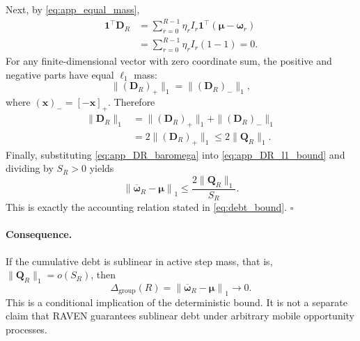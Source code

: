 Next, by \eqref{eq:app_equal_mass},
\begin{align}
    \mathbf{1}^{\top}\mathbf{D}_R
    &=
    \sum_{r=0}^{R-1}
    \eta_rI_r
    \mathbf{1}^{\top}
    \left(
    \boldsymbol\mu-\boldsymbol\omega_r
    \right)
    \nonumber\\
    &=
    \sum_{r=0}^{R-1}
    \eta_rI_r(1-1)
    =0.
    \label{eq:app_DR_zero_sum}
\end{align}
For any finite-dimensional vector with zero coordinate sum, the positive and
negative parts have equal $\ell_1$ mass:
\begin{equation}
    \|(\mathbf{D}_R)_+\|_1
    =
    \|(\mathbf{D}_R)_-\|_1,
    \label{eq:app_pos_neg_equal}
\end{equation}
where $(\mathbf{x})_-=[-\mathbf{x}]_+$.  Therefore
\begin{equation}
\begin{aligned}
    \|\mathbf{D}_R\|_1
    &=
    \|(\mathbf{D}_R)_+\|_1
    +
    \|(\mathbf{D}_R)_-\|_1\\
    &=2\|(\mathbf{D}_R)_+\|_1
    \le
    2\|\mathbf{Q}_R\|_1.
\end{aligned}
    \label{eq:app_DR_l1_bound}
\end{equation}
Finally, substituting
\eqref{eq:app_DR_baromega} into
\eqref{eq:app_DR_l1_bound} and dividing by $S_R>0$ yields
\begin{equation}
    \left\|
    \overline{\boldsymbol\omega}_R
    -
    \boldsymbol\mu
    \right\|_1
    \le
    \frac{
    2\|\mathbf{Q}_R\|_1
    }{
    S_R
    }.
    \label{eq:app_debt_bound_final}
\end{equation}
This is exactly the accounting relation stated in
\eqref{eq:debt_bound}. \hfill$\square$

\paragraph{Consequence.}
If the cumulative debt is sublinear in active step mass, that is,
$\|\mathbf{Q}_R\|_1=o(S_R)$, then
\begin{equation}
    \Delta_{\mathrm{group}}(R)
    =
    \left\|
    \overline{\boldsymbol\omega}_R
    -
    \boldsymbol\mu
    \right\|_1
    \longrightarrow0.
    \label{eq:app_debt_sublinear_consequence}
\end{equation}
This is a conditional implication of the deterministic bound.  It is not a
separate claim that RAVEN guarantees sublinear debt under arbitrary mobile
opportunity processes.



